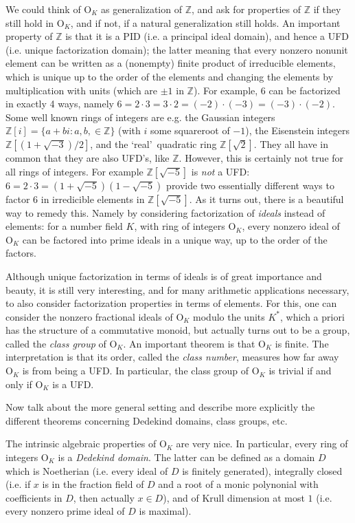 \documentclass[a4paper,USenglish,cleveref, autoref, thm-restate]{lipics-v2021}
\newcommand{\OK}{\mathrm{O}_K}
\newcommand{\Z}{\mathbb{Z}}
\begin{document}
We could think of $\OK$ as generalization of $\Z$, and ask for properties of $\Z$ if they still hold in $\OK$, and if not, if a natural generalization still holds. An important property of $\Z$ is that it is a PID (i.e. a principal ideal domain), and hence a UFD (i.e. unique factorization domain); the latter meaning that every nonzero nonunit element can be written as a (nonempty) finite product of irreducible elements, which is unique up to the order of the elements and changing the elements by multiplication with units (which are $\pm 1$ in $\Z$).
For example, $6$ can be factorized in exactly 4 ways, namely $6=2\cdot 3=3\cdot2=(-2)\cdot (-3)=(-3) \cdot (-2)$. Some well known rings of integers are e.g. the Gaussian integers $\Z[i]=\{a+b i : a,b, \in \Z\}$ (with $i$ some squareroot of $-1$), the Eisenstein integers $\Z[(1+\sqrt{-3})/2]$, and the \lq real\rq\ quadratic ring $\Z[\sqrt{2}]$. They all have in common that they are also UFD's, like $\Z$. However, this is certainly not true for all rings of integers. For example $\Z[\sqrt{-5}]$ is \emph{not} a UFD: $6=2\cdot3=(1+\sqrt{-5}) (1-\sqrt{-5})$ provide two essentially different ways to factor $6$ in irredicible elements in $\Z[\sqrt{-5}]$.
As it turns out, there is a beautiful way to remedy this. Namely by considering factorization of \emph{ideals} instead of elements: for a number field $K$, with ring of integers $\OK$, every nonzero ideal of $\OK$ can be factored into prime ideals in a unique way, up to the order of the factors.

Although unique factorization in terms of ideals is of great importance and beauty, it is still very interesting, and for many arithmetic applications necessary, to also consider factorization properties in terms of elements. For this, one can consider the nonzero fractional ideals of $\OK$ modulo the units $K^*$, which a priori has the structure of a commutative monoid, but actually turns out to be a group, called the \emph{class group} of $\OK$. An important theorem is that $\OK$ is finite. The interpretation is that its order, called the \emph{class number}, measures how far away $\OK$ is from being a UFD. In particular, the class group of $\OK$ is trivial if and only if $\OK$ is a UFD.


Now talk about the more general setting and describe more explicitly  the different theorems concerning Dedekind domains, class groups, etc.

The intrinsic algebraic properties of $\OK$ are very nice. In particular, every ring of integers $\OK$ is a \emph{Dedekind domain}. The latter can be defined as a domain $D$ which is Noetherian (i.e. every ideal of $D$ is finitely generated), integrally closed (i.e. if $x$ is in the fraction field of $D$ and a root of a monic polynonial with coefficients in  $D$, then actually $x \in D$), and of Krull dimension at most $1$ (i.e. every nonzero prime ideal of $D$ is maximal).
\end{document}
